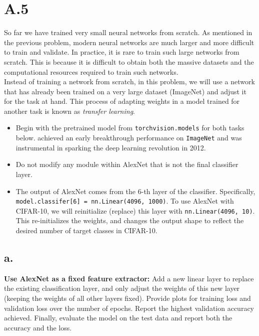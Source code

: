 \documentclass{article}
\newcommand{\1}{\mathbf{1}}
\begin{document}
\section*{A.5}
{\Large 

So far we have trained very small neural networks from scratch. As mentioned in the previous problem, modern neural networks are much larger and more difficult to train and validate. In practice, it is rare to train such large networks from scratch. This is because it is difficult to obtain both the massive datasets and the computational resources required to train such networks. \\
 
 Instead of training a network from scratch, in this problem, we will use a network that has already been trained on a very large dataset (ImageNet) and adjust it for the task at hand. This process of adapting weights in a model trained for another task is known as \textit{transfer learning}.
\begin{itemize}
    \item Begin with the pretrained  model from \texttt{torchvision.models} for both tasks below.  achieved an early breakthrough performance on \texttt{ImageNet} and was instrumental in sparking the deep learning revolution in 2012.
    \item Do not modify any module within AlexNet that is not the final classifier layer.
    \item The output of AlexNet comes from the $6$-th layer of the classifier. Specifically, \texttt{model.classifer[6] = nn.Linear(4096, 1000)}. To use AlexNet with CIFAR-10, we will reinitialize (replace) this layer with \texttt{nn.Linear(4096, 10)}. This re-initializes the weights, and changes the output shape to reflect the desired number of target classes in CIFAR-10. 
\end{itemize}

\subsection*{a.}

\textbf{Use AlexNet as a fixed feature extractor:} Add a new linear layer to replace the existing classification layer, and only adjust the weights of this new layer (keeping the weights of all other layers fixed). Provide plots for training loss and validation loss over the number of epochs. Report the highest validation accuracy achieved. Finally, evaluate the model on the test data and report both the accuracy and the loss.  
    
}
\end{document}
